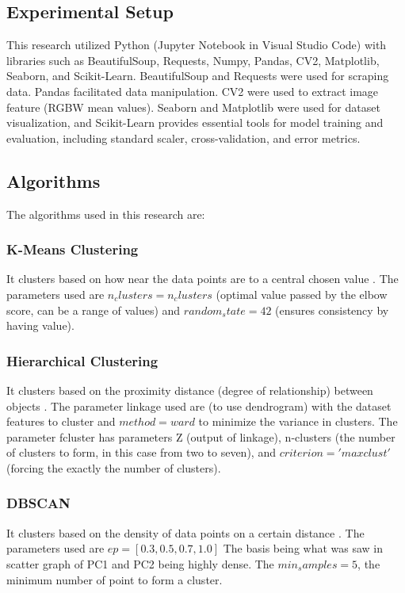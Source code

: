 \documentclass[conference]{IEEEtran}
\begin{document}
\subsection{Experimental Setup}
This research utilized Python (Jupyter Notebook in Visual Studio Code) with libraries such as BeautifulSoup, Requests, Numpy, Pandas, CV2, Matplotlib, Seaborn, and Scikit-Learn. BeautifulSoup and Requests were used for scraping data. Pandas facilitated data manipulation. CV2 were used to extract image feature (RGBW mean values).  Seaborn and Matplotlib were used for dataset visualization, and Scikit-Learn provides essential tools for model training and evaluation, including standard scaler, cross-validation, and error metrics.

\subsection{Algorithms}
The algorithms used in this research are:

\subsubsection{K-Means Clustering}
It clusters based on how near the data points are to a central chosen value \cite{b7}. The parameters used are $n_clusters=n_clusters$ (optimal value passed by the elbow score, can be a range of values) and $random_state=42$ (ensures consistency by having value).

\subsubsection{Hierarchical Clustering}
It clusters based on the proximity distance (degree of relationship) between objects \cite{b7}. The parameter linkage used are (to use dendrogram) with the dataset features to cluster and $method=ward$ to minimize the variance in clusters. The parameter fcluster has parameters Z (output of linkage), n-clusters (the number of clusters to form, in this case from two to seven), and $criterion='maxclust'$ (forcing the exactly the number of clusters).

\subsubsection{DBSCAN}
It clusters based on the density of data points on a certain distance \cite{b7}. The parameters used are $ep=[0.3,0.5,0.7,1.0]$ The basis being what was saw in scatter graph of PC1 and PC2 being highly dense. The $min_samples=5$, the minimum number of point to form a cluster.
\end{document}
